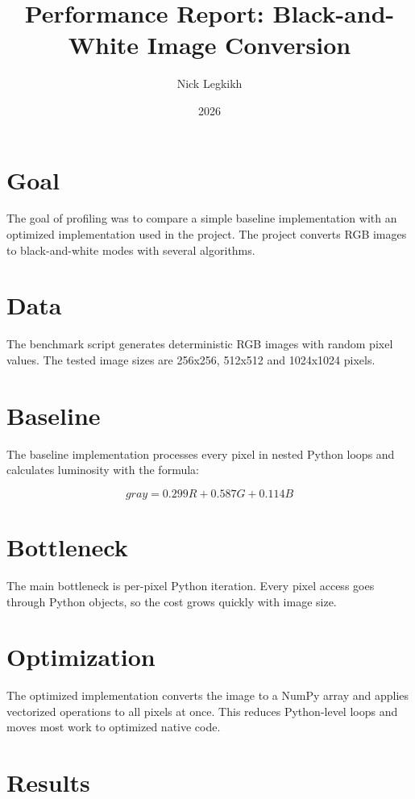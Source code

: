 \documentclass{article}
\title{Performance Report: Black-and-White Image Conversion}
\author{Nick Legkikh}
\date{2026}
\begin{document}
\maketitle

\section{Goal}

The goal of profiling was to compare a simple baseline implementation with an
optimized implementation used in the project. The project converts RGB images to
black-and-white modes with several algorithms.

\section{Data}

The benchmark script generates deterministic RGB images with random pixel values.
The tested image sizes are 256x256, 512x512 and 1024x1024 pixels.

\section{Baseline}

The baseline implementation processes every pixel in nested Python loops and
calculates luminosity with the formula:

\[
gray = 0.299R + 0.587G + 0.114B
\]

\section{Bottleneck}

The main bottleneck is per-pixel Python iteration. Every pixel access goes
through Python objects, so the cost grows quickly with image size.

\section{Optimization}

The optimized implementation converts the image to a NumPy array and applies
vectorized operations to all pixels at once. This reduces Python-level loops and
moves most work to optimized native code.

\section{Results}
\end{document}
